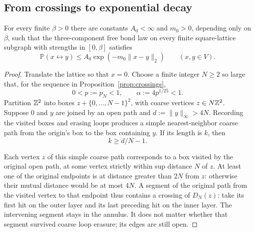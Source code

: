 \subsection{From crossings to exponential decay}

\begin{proposition}\label{prop:connection}
For every finite $\beta>0$ there are constants $A_0<\infty$ and
$m_0>0$, depending only on $\beta$, such that the three-component free
bond law on every finite square-lattice subgraph with strengths in
$[0,\beta]$ satisfies
\[
 \mathbb P(x\leftrightarrow y)
 \leq A_0\exp(-m_0\|x-y\|_2)
 \qquad(x,y\in V).
\]
\end{proposition}

\begin{proof}
Translate the lattice so that $x=0$.  Choose a finite integer $N\geq2$
so large that, for the sequence in Proposition~\ref{prop:crossings},
\begin{equation}\label{eq:coarse-path-alpha}
 0<p:=p_N<1,
 \qquad \alpha:=4p^{1/25}<1.
\end{equation}
Partition $\mathbb Z^2$ into boxes
$z+\{0,\ldots,N-1\}^2$, with coarse vertices $z\in N\mathbb Z^2$.
Suppose $0$ and $y$ are joined by an open path and
$d:=\|y\|_\infty>4N$.  Recording the visited boxes and erasing loops
produces a simple nearest-neighbor coarse path from the origin's box
to the box containing $y$.  If its length is $k$, then
\begin{equation}\label{eq:coarse-path-length}
 k\geq d/N-1.
\end{equation}

Each vertex $z$ of this simple coarse path corresponds to a box
visited by the original open path, at some vertex strictly within
sup distance $N$ of $z$.  At least one of the original endpoints is
at distance greater than $2N$ from $z$: otherwise their mutual
distance would be at most $4N$.  A segment of the original path from
the visited vertex to that endpoint thus contains a crossing of
$D_N(z)$: take its first hit on the outer layer and its last preceding
hit on the inner layer. The intervening segment stays in the annulus.  It does not matter whether that segment survived coarse
loop erasure; its edges are still open.


\end{proof}
